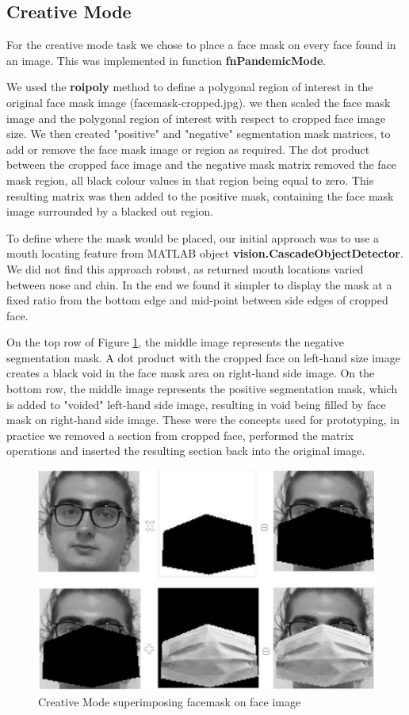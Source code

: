 \subsection{Creative Mode}
For the creative mode task we chose to place a face mask on every face found in an image. This was implemented in function \textbf{fnPandemicMode}. 
 
We used the \textbf{roipoly} method to define a polygonal region of interest in the original face mask image (facemask-cropped.jpg). we then scaled the face mask image and the polygonal region of interest with respect to cropped face image size. We then created "positive" and "negative" segmentation mask matrices, to add or remove the face mask image or region as required. The dot product between the cropped face image and the negative mask matrix removed the face mask region, all black colour values in that region being equal to zero. This resulting matrix was then added to the positive mask, containing the face mask image surrounded by a blacked out region.  

To define where the mask would be placed, our initial approach was to use a mouth locating feature from MATLAB object \textbf{vision.CascadeObjectDetector}. We did not find this approach robust, as returned mouth locations varied between nose and chin. In the end we found it simpler to display the mask at a fixed ratio from the bottom edge and mid-point between side edges of cropped face.

On the top row of Figure \ref{fig:pandemic_mode}, the middle image represents the negative segmentation mask. A dot product with the cropped face on left-hand size image creates a black void in the face mask area on right-hand side image. On the bottom row, the middle image represents the positive segmentation mask, which is added to "voided" left-hand side image, resulting in void being filled by face mask on right-hand side image. These were the concepts used for prototyping, in practice we removed a section from cropped face, performed the matrix operations and inserted the resulting section back into the original image.

\begin{figure}[h]
 \centering 
 \includegraphics[width=\columnwidth]{images/PandemicMode.png}
 \caption{Creative Mode superimposing facemask on face image}
 \label{fig:pandemic_mode}
\end{figure}